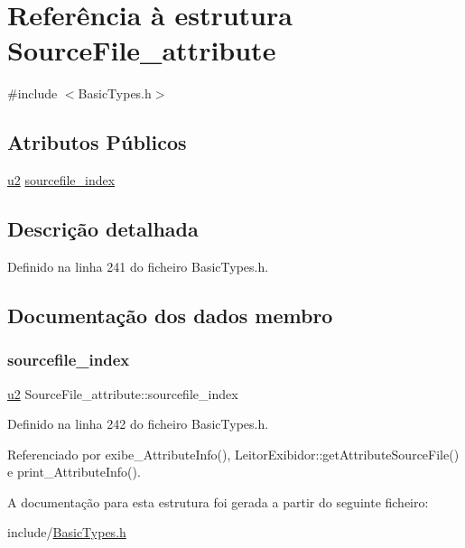 \hypertarget{structSourceFile__attribute}{}\section{Referência à estrutura Source\+File\+\_\+attribute}
\label{structSourceFile__attribute}


{\ttfamily \#include $<$Basic\+Types.\+h$>$}

\subsection*{Atributos Públicos}
\begin{DoxyCompactItemize}
\item 
\hyperlink{BasicTypes_8h_a732cde1300aafb73b0ea6c2558a7a54f}{u2} \hyperlink{structSourceFile__attribute_a13cba4fc8896792aad81ab821c3244ca}{sourcefile\+\_\+index}
\end{DoxyCompactItemize}


\subsection{Descrição detalhada}


Definido na linha 241 do ficheiro Basic\+Types.\+h.



\subsection{Documentação dos dados membro}
\mbox{\label{structSourceFile__attribute_a13cba4fc8896792aad81ab821c3244ca}} 
\subsubsection{\texorpdfstring{sourcefile\+\_\+index}{sourcefile\_index}}
{\footnotesize\ttfamily \hyperlink{BasicTypes_8h_a732cde1300aafb73b0ea6c2558a7a54f}{u2} Source\+File\+\_\+attribute\+::sourcefile\+\_\+index}



Definido na linha 242 do ficheiro Basic\+Types.\+h.



Referenciado por exibe\+\_\+\+Attribute\+Info(), Leitor\+Exibidor\+::get\+Attribute\+Source\+File() e print\+\_\+\+Attribute\+Info().



A documentação para esta estrutura foi gerada a partir do seguinte ficheiro\+:\begin{DoxyCompactItemize}
\item 
include/\hyperlink{BasicTypes_8h}{Basic\+Types.\+h}\end{DoxyCompactItemize}
